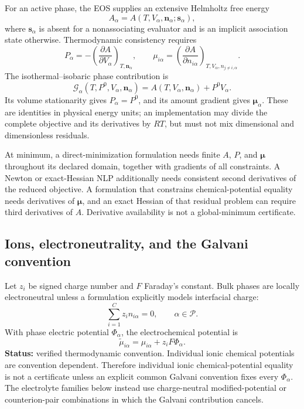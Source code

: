\documentclass[11pt]{article}
\newcommand{\Evidence}[1]{\textsf{#1}}
\newcommand{\Status}[1]{\textbf{Status:} \Evidence{#1}.}
\begin{document}
For an active phase, the EOS supplies an extensive Helmholtz free energy
\begin{equation}
 A_\alpha=A(T,V_\alpha,\boldsymbol n_\alpha;\boldsymbol s_\alpha),
\label{eq:eqform:helmholtz-owner}
\end{equation}
where \(\boldsymbol s_\alpha\) is absent for a nonassociating evaluator and is
an implicit association state otherwise. Thermodynamic consistency requires
\begin{equation}
 P_\alpha=-\left(\frac{\partial A}{\partial V_\alpha}\right)_
 {T,\boldsymbol n_\alpha},\qquad
 \mu_{i\alpha}=\left(\frac{\partial A}{\partial n_{i\alpha}}\right)_
 {T,V_\alpha,n_{j\neq i,\alpha}}.
\label{eq:eqform:eos-derivatives}
\end{equation}
The isothermal--isobaric phase contribution is
\begin{equation}
 \mathcal G_\alpha(T,P^0,V_\alpha,\boldsymbol n_\alpha)
 =A(T,V_\alpha,\boldsymbol n_\alpha)+P^0V_\alpha.
\label{eq:eqform:phase-gibbs-transform}
\end{equation}
Its volume stationarity gives \(P_\alpha=P^0\), and its amount gradient gives
\(\boldsymbol\mu_\alpha\). These are identities in physical energy units; an
implementation may divide the complete objective and its derivatives by
\(RT\), but must not mix dimensional and dimensionless residuals.

At minimum, a direct-minimization formulation needs finite \(A\), \(P\), and
\(\boldsymbol\mu\) throughout its declared domain, together with gradients of
all constraints. A Newton or exact-Hessian NLP additionally needs consistent
second derivatives of the reduced objective. A formulation that constrains
chemical-potential equality needs derivatives of \(\boldsymbol\mu\), and an
exact Hessian of that residual problem can require third derivatives of \(A\).
Derivative availability is not a global-minimum certificate.

\subsection{Ions, electroneutrality, and the Galvani convention}

Let \(z_i\) be signed charge number and \(F\) Faraday's constant. Bulk phases
are locally electroneutral unless a formulation explicitly models interfacial
charge:
\begin{equation}
 \sum_{i=1}^{C}z_i n_{i\alpha}=0,\qquad \alpha\in\mathcal P.
\label{eq:eqform:phase-electroneutrality}
\end{equation}
With phase electric potential \(\Phi_\alpha\), the electrochemical potential is
\begin{equation}
 \widetilde\mu_{i\alpha}=\mu_{i\alpha}+z_iF\Phi_\alpha.
\label{eq:eqform:electrochemical-potential}
\end{equation}
\Status{verified thermodynamic convention}
Individual ionic chemical potentials are convention dependent. Therefore
individual ionic chemical-potential equality is not a certificate unless an
explicit common Galvani convention fixes every \(\Phi_\alpha\). The
electrolyte families below instead use charge-neutral modified-potential or
counterion-pair combinations in which the Galvani contribution cancels.
\end{document}
